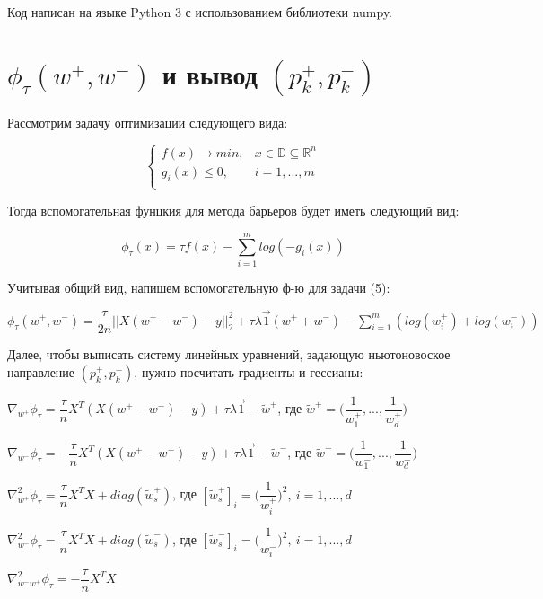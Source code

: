\documentclass[12pt, a4paper]{article}
\begin{document}
    Код написан на языке Python 3 с использованием библиотеки numpy.


    \section{$\phi_\tau(w^+, w^-)$ и вывод $(p_k^+, p_k^-)$}

    Рассмотрим задачу оптимизации следующего вида:

    $$
    \begin{cases}
        f(x) \to min, & x \in \mathbb{D} \subseteq \mathbb{R}^n\\
        g_i(x) \leq 0, & i = 1, ..., m\\
    \end{cases}
    $$

    Тогда вспомогательная фунцкия для метода барьеров будет иметь следующий вид:

    $$\phi_\tau(x) = \tau f(x) - \displaystyle\sum_{i=1}^{m}log(-g_i(x))$$

    Учитывая общий вид, напишем вспомогательную ф-ю для задачи (5):

    $\phi_\tau(w^+, w^-) = \dfrac{\tau}{2n}||X(w^+ - w^-) - y||_2^2 + \tau\lambda\vec{1}(w^+ + w^-) - \displaystyle\sum_{i=1}^{m}(log(w_i^+) + log(w_i^-))$

    \medskip

    Далее, чтобы выписать систему линейных уравнений, задающую ньютоновоское направление $(p_k^+, p_k^-)$, нужно посчитать градиенты и гессианы:

    $\nabla_{w^+} \phi_\tau = \dfrac{\tau}{n} X^T(X(w^+ - w^-) - y) + \tau\lambda\vec{1} - \widetilde{w}^+$, где $\widetilde{w}^+ = \Big(\dfrac{1}{w_1^+}, ..., \dfrac{1}{w_d^+}\Big)$

    $\nabla_{w^-} \phi_\tau = -\dfrac{\tau}{n} X^T(X(w^+ - w^-) - y) + \tau\lambda\vec{1} - \widetilde{w}^-$, где $\widetilde{w}^- = \Big(\dfrac{1}{w_1^-}, ..., \dfrac{1}{w_d^-}\Big)$

    $\nabla_{w^+}^2 \phi_\tau = \dfrac{\tau}{n} X^TX + diag(\widetilde{w}_s^+)$, где $[\widetilde{w}_s^+]_i = \Big(\dfrac{1}{w_i^+}\Big)^2, \ i = 1, ..., d$

    $\nabla_{w^-}^2 \phi_\tau = \dfrac{\tau}{n} X^TX + diag(\widetilde{w}_s^-)$, где $[\widetilde{w}_s^-]_i = \Big(\dfrac{1}{w_i^-}\Big)^2, \ i = 1, ..., d$

    $\nabla_{w^-w^+}^2 \phi_\tau = -\dfrac{\tau}{n} X^TX$

    \medskip
\end{document}
